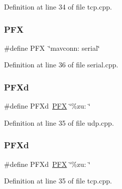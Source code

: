 Definition at line 34 of file tcp.\+cpp.

\mbox{\label{group__mavconn_ga176e4c39a833f4d01f0ecd322c0f4343}} 
\subsubsection{\texorpdfstring{PFX}{PFX}\hspace{0.1cm}{\footnotesize\ttfamily [4/4]}}
{\footnotesize\ttfamily \#define P\+FX~\char`\"{}mavconn\+: serial\char`\"{}}



Definition at line 36 of file serial.\+cpp.

\mbox{\label{group__mavconn_ga9aa83a322c418c99083b35fddccd39e3}} 
\subsubsection{\texorpdfstring{PFXd}{PFXd}\hspace{0.1cm}{\footnotesize\ttfamily [1/3]}}
{\footnotesize\ttfamily \#define P\+F\+Xd~\mbox{\hyperlink{group__mavconn_ga176e4c39a833f4d01f0ecd322c0f4343}{P\+FX}} \char`\"{}\%zu\+: \char`\"{}}



Definition at line 35 of file udp.\+cpp.

\mbox{\label{group__mavconn_ga9aa83a322c418c99083b35fddccd39e3}} 
\subsubsection{\texorpdfstring{PFXd}{PFXd}\hspace{0.1cm}{\footnotesize\ttfamily [2/3]}}
{\footnotesize\ttfamily \#define P\+F\+Xd~\mbox{\hyperlink{group__mavconn_ga176e4c39a833f4d01f0ecd322c0f4343}{P\+FX}} \char`\"{}\%zu\+: \char`\"{}}



Definition at line 35 of file tcp.\+cpp.

\mbox{\label{group__mavconn_ga9aa83a322c418c99083b35fddccd39e3}} 
